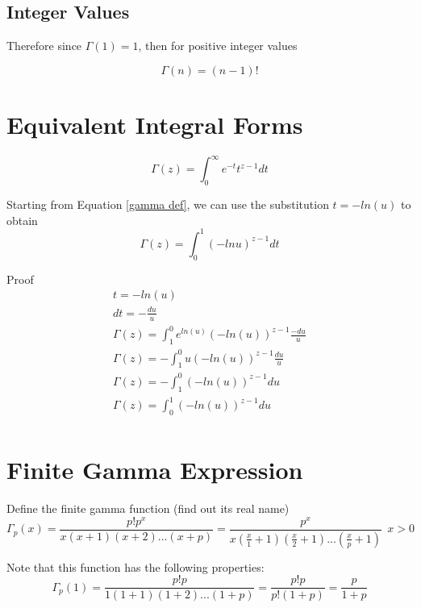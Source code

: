 \documentclass[a4paper]{article}
\begin{document}
\subsection{Integer Values}
Therefore since $\Gamma(1) = 1$, then for positive integer values 

\begin{equation}
\Gamma(n) = (n-1)!
\end{equation}

\section{Equivalent Integral Forms}

\begin{equation}
\Gamma(z) = \int_{0}^{\infty} e^{-t} t^{z-1} dt
\end{equation}

\begin{theorem}
Starting from Equation \ref{gamma def}, we can use the substitution $t = -ln(u)$ to obtain 
\begin{equation}
\Gamma(z) = \int_{0}^{1} (-ln u)^{z-1} dt
\end{equation}

Proof
\begin{gather*}
t = -ln(u) \\
dt = - \frac{du}{u} \\
\Gamma(z) = \int_{1}^{0} e^{ln(u)} (-ln(u))^{z-1} \frac{-du}{u} \\
\Gamma(z) = - \int_{1}^{0} u (-ln(u))^{z-1} \frac{du}{u} \\
\Gamma(z) = - \int_{1}^{0} (-ln(u))^{z-1} du \\
\Gamma(z) = \int_{0}^{1} (-ln(u))^{z-1} du \\
\end{gather*}
\end{theorem}


\section{Finite Gamma Expression}
Define the finite gamma function (find out its real name)
\begin{equation}\label{gamma def}
\Gamma_{p}(x) = \frac{p! p^x}{x (x+ 1)(x + 2)...(x + p)} = \frac{p^x}{x (\frac{x}{1} + 1)(\frac{x}{2} + 1)...(\frac{x}{p} + 1)}  
\ \ x>0
\end{equation}

Note that this function has the following properties:
\begin{equation}
\Gamma_{p}(1) = \frac{p! p}{1 (1 + 1)(1+2)...(1+p)} = \frac{p! p}{p! (1+p)} = \frac{p}{1+p} 
\end{equation}
\end{document}
